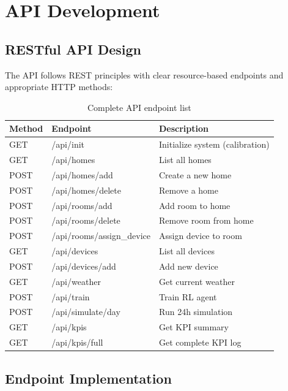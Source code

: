 \documentclass[12pt,a4paper]{article}
\begin{document}
\section{API Development}

\subsection{RESTful API Design}

The API follows REST principles with clear resource-based endpoints and appropriate HTTP methods:

\begin{table}[H]
\centering
\small
\begin{tabular}{@{}p{2.5cm}p{4cm}p{5.5cm}@{}}
\toprule
\textbf{Method} & \textbf{Endpoint} & \textbf{Description} \\ \midrule
GET & /api/init & Initialize system (calibration) \\
GET & /api/homes & List all homes \\
POST & /api/homes/add & Create a new home \\
POST & /api/homes/delete & Remove a home \\
POST & /api/rooms/add & Add room to home \\
POST & /api/rooms/delete & Remove room from home \\
POST & /api/rooms/assign\_device & Assign device to room \\
GET & /api/devices & List all devices \\
POST & /api/devices/add & Add new device \\
GET & /api/weather & Get current weather \\
POST & /api/train & Train RL agent \\
POST & /api/simulate/day & Run 24h simulation \\
GET & /api/kpis & Get KPI summary \\
GET & /api/kpis/full & Get complete KPI log \\ \bottomrule
\end{tabular}
\caption{Complete API endpoint list}
\label{tab:api-endpoints}
\end{table}

\subsection{Endpoint Implementation}
\end{document}
